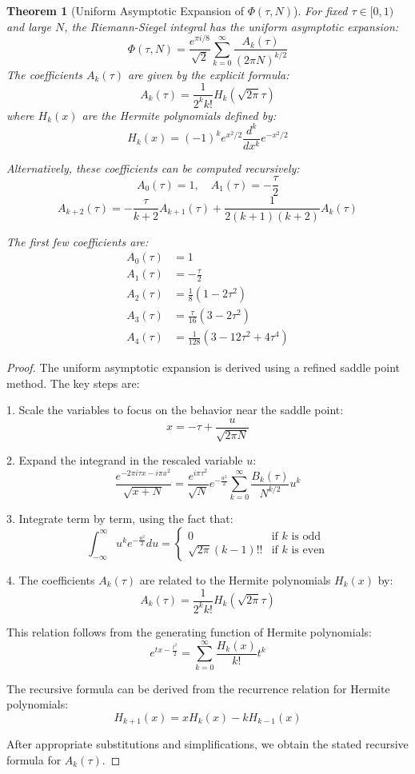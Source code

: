 \documentclass{article}
\newtheorem{theorem}{Theorem}
\begin{document}
\begin{theorem}[Uniform Asymptotic Expansion of $\Phi(\tau, N)$]
For fixed $\tau \in [0,1)$ and large $N$, the Riemann-Siegel integral has the uniform asymptotic expansion:
\[
\Phi(\tau, N) = \frac{e^{\pi i/8}}{\sqrt{2}} \sum_{k=0}^{\infty} \frac{A_k(\tau)}{(2\pi N)^{k/2}}
\]
The coefficients $A_k(\tau)$ are given by the explicit formula:
\[
A_k(\tau) = \frac{1}{2^k k!} H_k(\sqrt{2\pi}\tau)
\]
where $H_k(x)$ are the Hermite polynomials defined by:
\[
H_k(x) = (-1)^k e^{x^2/2} \frac{d^k}{dx^k} e^{-x^2/2}
\]

Alternatively, these coefficients can be computed recursively:
\[
A_0(\tau) = 1, \quad A_1(\tau) = -\frac{\tau}{2}
\]
\[
A_{k+2}(\tau) = -\frac{\tau}{k+2}A_{k+1}(\tau) + \frac{1}{2(k+1)(k+2)}A_k(\tau)
\]

The first few coefficients are:
\begin{align*}
A_0(\tau) &= 1 \\
A_1(\tau) &= -\frac{\tau}{2} \\
A_2(\tau) &= \frac{1}{8}(1-2\tau^2) \\
A_3(\tau) &= \frac{\tau}{16}(3-2\tau^2) \\
A_4(\tau) &= \frac{1}{128}(3-12\tau^2+4\tau^4)
\end{align*}
\end{theorem}

\begin{proof}
The uniform asymptotic expansion is derived using a refined saddle point method. The key steps are:

1. Scale the variables to focus on the behavior near the saddle point:
\[
x = -\tau + \frac{u}{\sqrt{2\pi N}}
\]

2. Expand the integrand in the rescaled variable $u$:
\[
\frac{e^{-2\pi i\tau x - i\pi x^2}}{\sqrt{x+N}} = \frac{e^{i\pi\tau^2}}{\sqrt{N}} e^{-\frac{u^2}{2}} \sum_{k=0}^{\infty} \frac{B_k(\tau)}{N^{k/2}} u^k
\]

3. Integrate term by term, using the fact that:
\[
\int_{-\infty}^{\infty} u^k e^{-\frac{u^2}{2}} du = 
\begin{cases}
0 & \text{if } k \text{ is odd} \\
\sqrt{2\pi} (k-1)!! & \text{if } k \text{ is even}
\end{cases}
\]

4. The coefficients $A_k(\tau)$ are related to the Hermite polynomials $H_k(x)$ by:
\[
A_k(\tau) = \frac{1}{2^k k!} H_k(\sqrt{2\pi}\tau)
\]

This relation follows from the generating function of Hermite polynomials:
\[
e^{tx-\frac{t^2}{2}} = \sum_{k=0}^{\infty} \frac{H_k(x)}{k!} t^k
\]

The recursive formula can be derived from the recurrence relation for Hermite polynomials:
\[
H_{k+1}(x) = x H_k(x) - k H_{k-1}(x)
\]

After appropriate substitutions and simplifications, we obtain the stated recursive formula for $A_k(\tau)$.
\end{proof}
\end{document}
